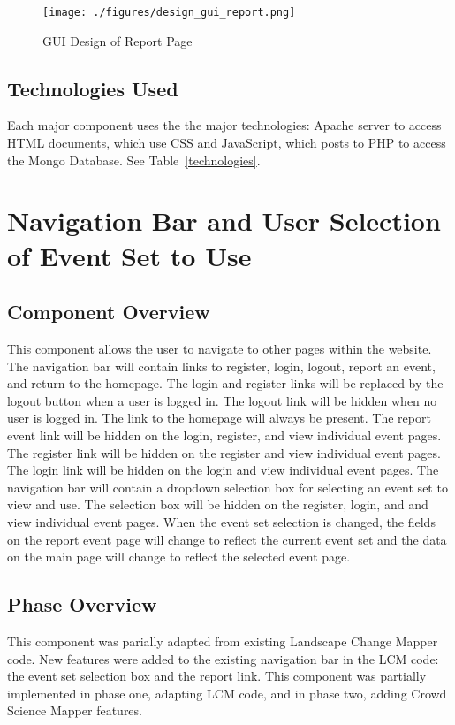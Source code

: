 \begin{figure}[!htb]
\begin{center}
\texttt{[image: ./figures/design\_gui\_report.png]}
\end{center}
\caption{GUI Design of Report Page \label{design_gui_report}}
\end{figure}
 
 \subsection{Technologies  Used}
Each major component uses the the major technologies: Apache server to access HTML documents, which use CSS and JavaScript, which posts to PHP to access the Mongo Database. See Table~\ref{technologies}.  

\section{Navigation Bar and User Selection of Event Set to Use}

\subsection{Component  Overview}
This component allows the user to navigate to other pages within the website. The navigation bar will contain links to register, login, logout, report an event, and return to the homepage. The login and register links will be replaced by the logout button when a user is logged in. The logout link will be hidden when no user is logged in. The link to the homepage will always be present. The report event link will be hidden on the login, register, and view individual event pages. The register link will be hidden on the register and view individual event pages. The login link will be hidden on the login and view individual event pages. The navigation bar will contain a dropdown selection box for selecting an event set to view and use. The selection box will be hidden on the register, login, and and view individual event pages. When the event set selection is changed, the fields on the report event page will change to reflect the current event set and the data on the main page will change to reflect the selected event page.

\subsection{Phase Overview}
This component was parially adapted from existing Landscape Change Mapper code. New features were added to the existing navigation bar in the LCM code: the event set selection box and the report link. This component was partially implemented in phase one, adapting LCM code, and in phase two, adding Crowd Science Mapper features.

